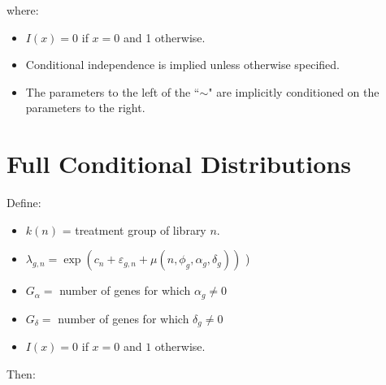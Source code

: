 \documentclass{article}\usepackage{graphicx, color}
\providecommand{\e}{\varepsilon}
\begin{document}
\begin{flushleft}
where:
\begin{itemize}
\item $I(x) = 0$ if $x = 0$ and 1 otherwise. 
\item Conditional independence is implied unless otherwise specified.
\item The parameters to the left of the ``$\sim$" are implicitly conditioned on the parameters to the right.
\end{itemize}




\section{Full Conditional Distributions}

Define:

\begin{itemize}
\item  $k(n)$ = treatment group of library $n$.
\item $\lambda_{g, n} = \exp(c_n + \e_{g, n} + \mu(n, \phi_g, \alpha_g, \delta_g))$ )
\item $G_\alpha = $ number of genes for which $\alpha_g \ne 0$
\item $G_\delta = $ number of genes for which $\delta_g \ne 0$
\item $I(x) = 0$ if $x = 0$ and $1$ otherwise.
\end{itemize}

Then: 


\end{flushleft}
\end{document}
